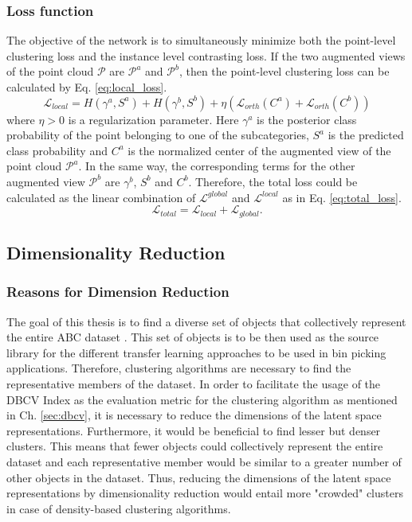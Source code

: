 \subsubsection{Loss function}
The objective of the network is to simultaneously minimize both the point-level clustering loss and the instance level contrasting loss. If the two augmented views of the point cloud $\mathcal{P}$ are $\mathcal{P}^a$ and $\mathcal{P}^b$, then the point-level clustering loss can be calculated by Eq. \ref{eq:local_loss}.
\begin{equation}
    \label{eq:local_loss}
    \mathcal{L}_{\mathit{local}} = H(\gamma^{a}, S^a) + H(\gamma^{b}, S^b) + \eta(\mathcal{L}_{orth}(C^a) + \mathcal{L}_{orth}(C^b))
\end{equation}
where $\eta>0$ is a regularization parameter. Here $\gamma^a$ is the posterior class probability of the point belonging to one of the subcategories, $S^a$ is the predicted class probability and $C^a$ is the normalized center of the augmented view of the point cloud $\mathcal{P}^a$. In the same way, the corresponding terms for the other augmented view $\mathcal{P}^b$ are $\gamma^b$, $S^b$ and $C^b$. Therefore, the total loss could be calculated as the linear combination of $\mathcal{L}^{global}$ and $\mathcal{L}^{local}$ as in Eq. \ref{eq:total_loss}.
\begin{equation}
    \label{eq:total_loss}
    \mathcal{L}_{\mathit{total}} = \mathcal{L}_{\mathit{local}} + \mathcal{L}_{\mathit{global}}.
\end{equation}

\subsection{Dimensionality Reduction}
\subsubsection{Reasons for Dimension Reduction}
The goal of this thesis is to find a diverse set of objects that collectively represent the entire ABC dataset \cite{Koch_2019_CVPR}. This set of objects is to be then used as the source library for the different transfer learning approaches to be used in bin picking applications. Therefore, clustering algorithms are necessary to find the representative members of the dataset. In order to facilitate the usage of the \ac{DBCV} Index as the evaluation metric for the clustering algorithm as mentioned in Ch. \ref{sec:dbcv}, it is necessary to reduce the dimensions of the latent space representations. Furthermore, it would be beneficial to find lesser but denser clusters. This means that fewer objects could collectively represent the entire dataset and each representative member would be similar to a greater number of other objects in the dataset. Thus, reducing the dimensions of the latent space representations by dimensionality reduction would entail more "crowded" clusters in case of density-based clustering algorithms.

